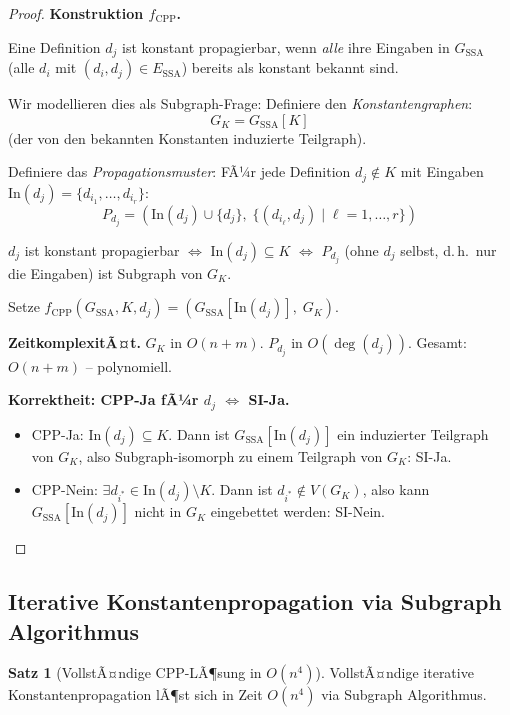 ﻿\documentclass[a4paper,12pt]{article}
\theoremstyle{definition}
\newtheorem{satz}{Satz}
\begin{document}
\begin{proof}
\textbf{Konstruktion $f_{\text{CPP}}$.}

Eine Definition $d_j$ ist konstant propagierbar, wenn \emph{alle} ihre Eingaben in $G_{\text{SSA}}$ (alle $d_i$ mit $(d_i, d_j) \in E_{\text{SSA}}$) bereits als konstant bekannt sind.

Wir modellieren dies als Subgraph-Frage: Definiere den \emph{Konstantengraphen}:
\[
G_K = G_{\text{SSA}}[K]
\]
(der von den bekannten Konstanten induzierte Teilgraph).

Definiere das \emph{Propagationsmuster}: FÃ¼r jede Definition $d_j \notin K$ mit Eingaben $\text{In}(d_j) = \{d_{i_1}, \ldots, d_{i_r}\}$:
\[
P_{d_j} = (\text{In}(d_j) \cup \{d_j\},\; \{(d_{i_\ell}, d_j) \mid \ell = 1, \ldots, r\})
\]

$d_j$ ist konstant propagierbar $\Leftrightarrow$ $\text{In}(d_j) \subseteq K$ $\Leftrightarrow$ $P_{d_j}$ (ohne $d_j$ selbst, d.\,h.\ nur die Eingaben) ist Subgraph von $G_K$.

Setze $f_{\text{CPP}}(G_{\text{SSA}}, K, d_j) = (G_{\text{SSA}}[\text{In}(d_j)],\; G_K)$.

\textbf{ZeitkomplexitÃ¤t.}
$G_K$ in $O(n + m)$. $P_{d_j}$ in $O(\deg(d_j))$. Gesamt: $O(n + m)$ -- polynomiell.

\textbf{Korrektheit: CPP-Ja fÃ¼r $d_j$ $\Leftrightarrow$ SI-Ja.}
\begin{itemize}
    \item CPP-Ja: $\text{In}(d_j) \subseteq K$. Dann ist $G_{\text{SSA}}[\text{In}(d_j)]$ ein induzierter Teilgraph von $G_K$, also Subgraph-isomorph zu einem Teilgraph von $G_K$: SI-Ja.
    \item CPP-Nein: $\exists d_{i^*} \in \text{In}(d_j) \setminus K$. Dann ist $d_{i^*} \notin V(G_K)$, also kann $G_{\text{SSA}}[\text{In}(d_j)]$ nicht in $G_K$ eingebettet werden: SI-Nein.
\end{itemize}
\end{proof}

\subsection{Iterative Konstantenpropagation via Subgraph Algorithmus}

\begin{satz}[VollstÃ¤ndige CPP-LÃ¶sung in $O(n^4)$]
VollstÃ¤ndige iterative Konstantenpropagation lÃ¶st sich in Zeit $O(n^4)$ via Subgraph Algorithmus.
\end{satz}
\end{document}
